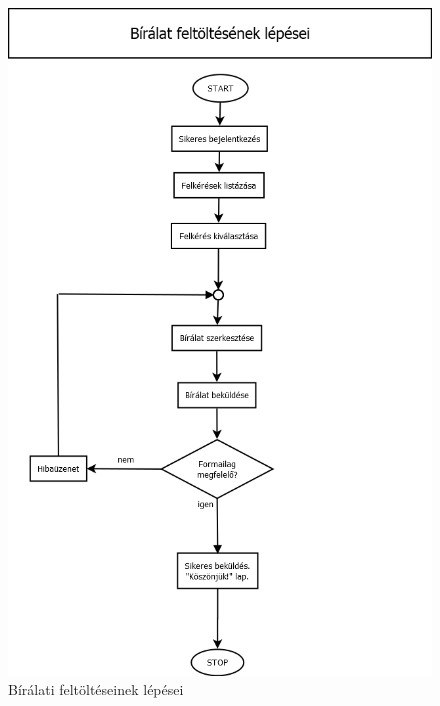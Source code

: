 \begin{figure}[h]
\centering
\includegraphics[scale=0.5]{images/Bírálat_feltöltése.png}
\caption{Bírálati feltöltéseinek lépései}
\label{fig:birala_feltoltese}
\end{figure}
